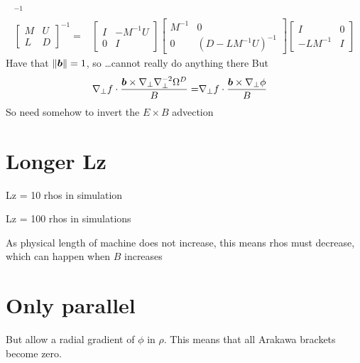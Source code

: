\begin{align*}
    ^{-1}
    \\
     \begin{bmatrix}
        M & U \\
        L & D
    \end{bmatrix}
    ^{-1}
    =&
    \begin{bmatrix}
        I & -M^{-1} U\\
        0 & I
    \end{bmatrix}
    \begin{bmatrix}
        M^{-1} & 0 \\
        0 & (D-L M^{-1} U)^{-1}
    \end{bmatrix}
    \begin{bmatrix}
        I & 0 \\
        -L M^{-1} & I
    \end{bmatrix}
\end{align*}
%
Have that $\|\boldsymbol{b}\|=1$, so \ldots cannot really do anything there
But
%
\begin{align*}
    \nabla_\perp f\cdot\frac{\boldsymbol{b}\times\nabla_\perp\nabla_\perp^{-2}\Omega^D}{B}
    =& \nabla_\perp f\cdot\frac{\boldsymbol{b}\times\nabla_\perp\phi}{B}
\end{align*}
%
So need somehow to invert the $E\times B$ advection

\section{Longer Lz}
%
Lz = 10 rhos in simulation

Lz = 100 rhos in simulations

As physical length of machine does not increase, this means rhos must decrease, which can happen when $B$ increases

\section{Only parallel}
%
But allow a radial gradient of $\phi$ in $\rho$.
This means that all Arakawa brackets become zero.

